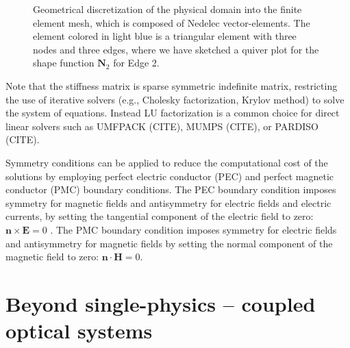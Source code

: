 \begin{figure}[tb]
    \centering
    \caption{Geometrical discretization of the physical domain into the finite element mesh, which is composed of Nedelec vector-elements. The element colored in light blue is a triangular element with three nodes and three edges, where we have sketched a quiver plot for the shape function $\mathbf{N}_2$ for Edge 2.}
    \label{fig:fem}
\end{figure}

Note that the stiffness matrix is sparse symmetric indefinite matrix, restricting the use of iterative solvers 
(e.g., Cholesky factorization, Krylov method) to solve the system of equations. Instead LU factorization is 
a common choice for direct linear solvers such as UMFPACK (CITE), MUMPS (CITE), or PARDISO (CITE).

Symmetry conditions can be applied to reduce the computational
cost of the solutions by employing perfect electric conductor (PEC) and perfect magnetic 
conductor (PMC) boundary conditions. The PEC boundary condition
imposes symmetry for magnetic fields and antisymmetry for electric fields and electric 
currents, by setting the tangential component of the electric field to zero: $\mathbf{n}\times \mathbf{E} = 0$ .
The PMC boundary condition imposes symmetry for electric fields and antisymmetry for magnetic fields
by setting the normal component of the magnetic field to zero: $\mathbf{n}\cdot \mathbf{H} = 0$.

\section{Beyond single-physics -- coupled optical systems}

